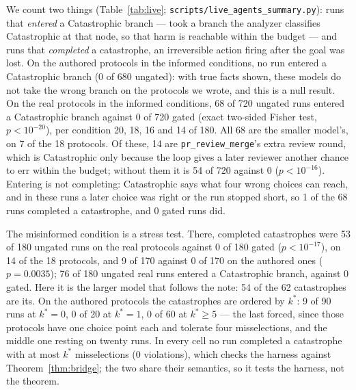\documentclass[a4paper,UKenglish,cleveref,autoref,thm-restate,anonymous]{lipics-v2021}
\newcommand{\Cat}{\textsf{Catastrophic}}
\newcommand{\kstar}{k^{*}}
\begin{document}
We count two things (Table~\ref{tab:live};
\texttt{scripts/live\_agents\_summary.py}): runs that \emph{entered} a \Cat{}
branch --- took a branch the analyzer classifies \Cat{} at that node, so that harm
is reachable within the budget --- and runs that \emph{completed} a catastrophe,
an irreversible action firing after the goal was lost. On the authored protocols
in the informed conditions, no run entered a \Cat{} branch (0 of 680 ungated):
with true facts shown, these models do not take the wrong branch on the protocols
we wrote, and this is a null result. On the real protocols in the informed
conditions, 68 of 720 ungated runs entered a \Cat{} branch against 0 of 720
gated (exact two-sided Fisher test, $p<10^{-20}$), per condition 20, 18, 16 and
14 of 180. All 68 are the smaller model's, on 7 of the 18 protocols. Of these, 14
are \texttt{pr\_review\_merge}'s extra review round, which is \Cat{} only because
the loop gives a later reviewer another chance to err within the budget; without
them it is 54 of 720 against 0 ($p<10^{-16}$). Entering is not completing: \Cat{}
says what four wrong choices can reach, and in these runs a later choice was
right or the run stopped short, so 1 of the 68 runs completed a catastrophe, and 0 gated runs did.

The misinformed condition is a stress test. There, completed catastrophes were 53
of 180 ungated runs on the real protocols against 0 of 180 gated
($p<10^{-17}$), on 14 of the 18 protocols, and 9 of 170 against 0 of 170 on the
authored ones ($p=0.0035$); 76 of 180 ungated real runs entered a \Cat{} branch,
against 0 gated. Here it is the larger model that follows the note: 54 of the 62
catastrophes are its. On the authored protocols the catastrophes are ordered by
$\kstar$: 9 of 90 runs at $\kstar=0$, 0 of 20 at $\kstar=1$, 0 of 60 at
$\kstar\ge5$ --- the last forced, since those protocols have one choice point each
and tolerate four misselections, and the middle one resting on twenty runs. In
every cell no run completed a catastrophe with at most $\kstar$ misselections (0
violations), which checks the harness against Theorem~\ref{thm:bridge}; the two
share their semantics, so it tests the harness, not the theorem.
\end{document}
